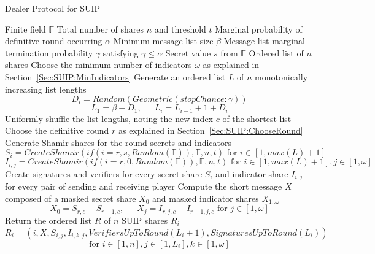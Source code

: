 \documentclass[12pt]{dalcsthesis}
\begin{document}
\begin{algorithm}
  \caption{Dealer Protocol for SUIP}
  \label{alg:SUIP:Dealer}
  \begin{algorithmic}
    \INPUT Finite field $\mathbb{F}$
    \INPUT Total number of shares $n$ and threshold $t$
    \INPUT Marginal probability of definitive round occurring $\alpha$
    \INPUT Minimum message list size $\beta$
    \INPUT Message list marginal termination probability $\gamma$ satisfying $\gamma \leq \alpha$
    \INPUT Secret value $s$ from $\mathbb{F}$
    \OUTPUT Ordered list of $n$ shares
    \STATE Choose the minimum number of indicators $\omega$ as explained in Section~\ref{Sec:SUIP:MinIndicators}
    \STATE Generate an ordered list $L$ of $n$ monotonically increasing list lengths
    	$$D_i = Random(Geometric(stopChance: \gamma))$$
    	$$L_1 = \beta + D_1 \text{, } \text{ } \text{ } L_i = L_{i-1} + 1 + D_i$$
    \STATE Uniformly shuffle the list lengths, noting the new index $c$ of the shortest list
    \STATE Choose the definitive round $r$ as explained in Section~\ref{Sec:SUIP:ChooseRound}
    \STATE Generate Shamir shares for the round secrets and indicators
    	$$S_{i} = CreateShamir(if(i = r, s, Random(\mathbb{F})), \mathbb{F}, n, t) \text{ for } i \in [1, max(L)+1]$$
    	$$I_{i,j} = CreateShamir(if(i = r, 0, Random(\mathbb{F})), \mathbb{F}, n, t) \text{ for } i \in [1, max(L)+1], j \in [1, \omega]$$
    \STATE Create signatures and verifiers for every secret share $S_i$ and indicator share $I_{i,j}$ for every pair of sending and receiving player
    \STATE Compute the short message $X$ composed of a masked secret share $X_0$ and masked indicator shares $X_{1..\omega}$
    	$$X_0 = S_{r,c} - S_{r-1,c} \text{, } \text{ } \text{ } X_j = I_{r,j,c} - I_{r-1,j,c} \text{ for } j \in [1, \omega]$$
    \STATE Return the ordered list $R$ of $n$ SUIP shares $R_i$
    	$$R_i = (i, X, S_{i,j}, I_{i,k,j}, VerifiersUpToRound(L_i+1), SignaturesUpToRound(L_i))$$
    	$$\text{for } i \in [1, n], j \in [1, L_i], k \in [1, \omega]$$
  \end{algorithmic}
\end{algorithm}
\end{document}
